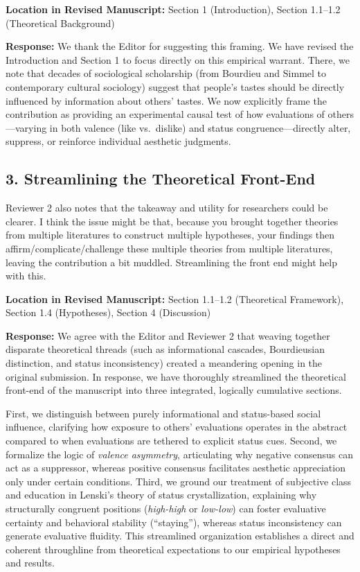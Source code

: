 \documentclass[11pt, letterpaper]{article}
\begin{document}
\textbf{Location in Revised Manuscript:} Section 1 (Introduction), Section 1.1--1.2 (Theoretical Background)

\textbf{Response:}
We thank the Editor for suggesting this framing. We have revised the Introduction and Section 1 to focus directly on this empirical warrant. There, we note that decades of sociological scholarship (from Bourdieu and Simmel to contemporary cultural sociology) suggest that people's tastes should be directly influenced by information about others' tastes. We now explicitly frame the contribution as providing an experimental causal test of how evaluations of others---varying in both valence (like vs.~dislike) and status congruence---directly alter, suppress, or reinforce individual aesthetic judgments.

\vspace{10pt}

\subsection*{3. Streamlining the Theoretical Front-End}

\begin{reviewercomment}
Reviewer 2 also notes that the takeaway and utility for researchers could be clearer. I think the issue might be that, because you brought together theories from multiple literatures to construct multiple hypotheses, your findings then affirm/complicate/challenge these multiple theories from multiple literatures, leaving the contribution a bit muddled. Streamlining the front end might help with this.
\end{reviewercomment}

\textbf{Location in Revised Manuscript:} Section 1.1--1.2 (Theoretical Framework), Section 1.4 (Hypotheses), Section 4 (Discussion)

\textbf{Response:}
We agree with the Editor and Reviewer 2 that weaving together disparate theoretical threads (such as informational cascades, Bourdieusian distinction, and status inconsistency) created a meandering opening in the original submission. In response, we have thoroughly streamlined the theoretical front-end of the manuscript into three integrated, logically cumulative sections.

First, we distinguish between purely informational and status-based social influence, clarifying how exposure to others' evaluations operates in the abstract compared to when evaluations are tethered to explicit status cues. Second, we formalize the logic of \textit{valence asymmetry}, articulating why negative consensus can act as a suppressor, whereas positive consensus facilitates aesthetic appreciation only under certain conditions. Third, we ground our treatment of subjective class and education in Lenski's theory of status crystallization, explaining why structurally congruent positions (\textit{high-high} or \textit{low-low}) can foster evaluative certainty and behavioral stability (``staying''), whereas status inconsistency can generate evaluative fluidity. This streamlined organization establishes a direct and coherent throughline from theoretical expectations to our empirical hypotheses and results.
\end{document}
